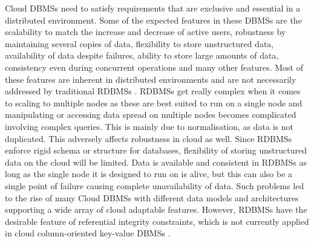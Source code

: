 Cloud \acp{DBMS}   need to satisfy requirements that are exclusive and essential
in a distributed environment.  Some of the expected features in these \acp{DBMS} 
are the scalability to match the increase and decrease of active users, 
robustness by maintaining several copies of data,  flexibility to store
unstructured data,  availability of data despite failures, ability to store large
amounts of data,  consistency even during  concurrent operations and many other
features.  Most of these features are inherent in distributed environments and
are not necessarily addressed by traditional \acp{RDBMS} .  \acp{RDBMS}  get really
complex when it comes to scaling to multiple nodes as these are best suited to
run on a single node and  manipulating or accessing data spread on multiple
nodes becomes complicated involving complex queries. This is mainly due to
normalisation,  as data is not duplicated.  This adversely affects robustness in
cloud as well.  Since \acp{RDBMS}  enforce rigid schema or structure for
databases,  flexibility of storing unstructured data on the cloud will be limited. 
Data is available and consistent in \acp{RDBMS}  as long as the single node it is
designed to run on is alive,  but this can also
be a single point of failure causing complete unavailability of data. 
Such problems led to the rise of many Cloud \acp{DBMS}  with different data
models and architectures supporting a wide array of cloud adaptable features. 
However,  \acp{RDBMS}  have the desirable feature of referential integrity
constraints,  which is not currently applied in cloud column-oriented key-value
\acp{DBMS} . 

